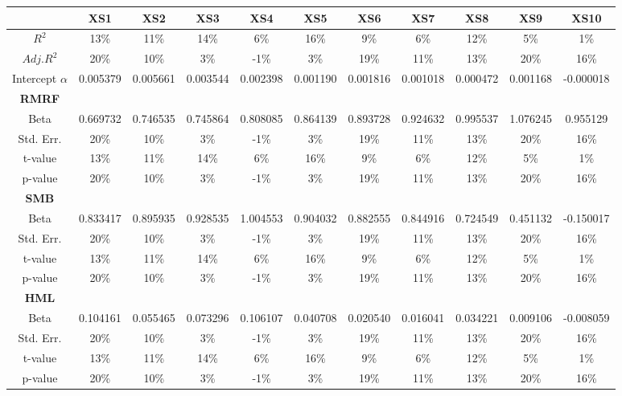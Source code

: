 \documentclass[11pt]{article}
\begin{document}
\begin{table}[H]
    \centering
    \tiny
    \begin{tabular}{ccccccccccc}
    \toprule\toprule
    & \textbf{XS1} & \textbf{XS2} & \textbf{XS3} & \textbf{XS4} & \textbf{XS5} & \textbf{XS6} & \textbf{XS7} & \textbf{XS8} & \textbf{XS9} & \textbf{XS10}\\ 
    \midrule
    $R^2$ & 13\% & 11\% & 14\% & 6\% & 16\% & 9\% & 6\% & 12\% & 5\% & 1\% \\
    $Adj. R^2$ & 20\% & 10\% & 3\% & -1\% & 3\% & 19\% & 11\% & 13\% & 20\% & 16\% \\
    Intercept $\alpha$ & 0.005379 & 0.005661 & 0.003544 & 0.002398 & 0.001190 & 0.001816 & 0.001018 & 0.000472 & 0.001168 & -0.000018 \\
    \midrule
    \textbf{RMRF} &  &  &  &  &  &  &  &  &  &  \\
    Beta & 0.669732 & 0.746535 & 0.745864 & 0.808085 & 0.864139 & 0.893728 & 0.924632 & 0.995537 & 1.076245 & 0.955129 \\
    Std. Err. & 20\% & 10\% & 3\% & -1\% & 3\% & 19\% & 11\% & 13\% & 20\% & 16\% \\
    t-value & 13\% & 11\% & 14\% & 6\% & 16\% & 9\% & 6\% & 12\% & 5\% & 1\% \\
    p-value & 20\% & 10\% & 3\% & -1\% & 3\% & 19\% & 11\% & 13\% & 20\% & 16\% \\
    \midrule
    \textbf{SMB} &  &  &  &  &  &  &  &  &  &  \\
    Beta & 0.833417 & 0.895935 & 0.928535 & 1.004553 & 0.904032 & 0.882555 & 0.844916 & 0.724549 & 0.451132 & -0.150017 \\
    Std. Err. & 20\% & 10\% & 3\% & -1\% & 3\% & 19\% & 11\% & 13\% & 20\% & 16\% \\
    t-value & 13\% & 11\% & 14\% & 6\% & 16\% & 9\% & 6\% & 12\% & 5\% & 1\% \\
    p-value & 20\% & 10\% & 3\% & -1\% & 3\% & 19\% & 11\% & 13\% & 20\% & 16\% \\
    \midrule
    \textbf{HML} &  &  &  &  &  &  &  &  &  &  \\
    Beta & 0.104161 & 0.055465 & 0.073296 & 0.106107 & 0.040708 & 0.020540 & 0.016041 & 0.034221 & 0.009106 & -0.008059 \\
    Std. Err. & 20\% & 10\% & 3\% & -1\% & 3\% & 19\% & 11\% & 13\% & 20\% & 16\% \\
    t-value & 13\% & 11\% & 14\% & 6\% & 16\% & 9\% & 6\% & 12\% & 5\% & 1\% \\
    p-value & 20\% & 10\% & 3\% & -1\% & 3\% & 19\% & 11\% & 13\% & 20\% & 16\% \\

\end{tabular}
\end{table}
\end{document}
